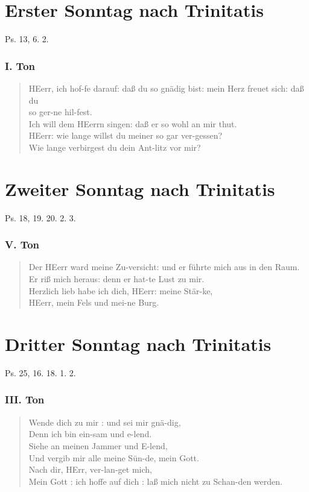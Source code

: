 \section{Erster Sonntag nach Trinitatis}

Ps. 13, 6. 2.

\subsubsection{I. Ton}
\begin{verse}
HEerr, ich hof-fe darauf: daß du so gnädig bist: mein Herz freuet sich: daß du\\
so ger-ne hil-fest.\\
Ich will dem HEerrn singen: daß er so wohl an mir thut.\\
HEerr: wie lange willst du meiner so gar ver-gessen?\\
Wie lange verbirgest du dein Ant-litz vor mir?
\end{verse}

\section{Zweiter Sonntag nach Trinitatis}

Ps. 18, 19. 20. 2. 3.

\subsubsection{V. Ton}
\begin{verse}
Der HEerr ward meine Zu-versicht: und er führte mich aus in den Raum.\\
Er riß mich heraus: denn er hat-te Lust zu mir.\\
Herzlich lieb habe ich dich, HEerr: meine Stär-ke,\\
HEerr, mein Fels und mei-ne Burg.
\end{verse}

\section{Dritter Sonntag nach Trinitatis}

Ps. 25, 16. 18. 1. 2.

\subsubsection{III. Ton}
\begin{verse}
Wende dich zu mir : und sei mir gnä-dig,\\
Denn ich bin ein-sam und e-lend.\\
Siehe an meinen Jammer und E-lend,\\
Und vergib mir alle meine Sün-de, mein Gott.\\
Nach dir, HErr, ver-lan-get mich,\\
Mein Gott : ich hoffe auf dich : laß mich nicht zu Schan-den werden.
\end{verse}

